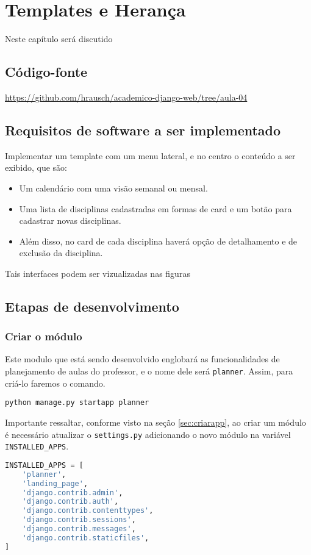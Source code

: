 \chapter{Templates e Heran\c{c}a}
Neste capítulo será discutido

\section{Código-fonte}
\href{https://github.com/hrausch/academico-django-web/tree/aula-04}{https://github.com/hrausch/academico-django-web/tree/aula-04}

\section{Requisitos de software a ser implementado}
Implementar um template com um menu lateral, e no centro o conteúdo a ser exibido, que são:
\begin{itemize}
    \item Um calendário com uma visão semanal ou mensal.
    \item Uma lista de disciplinas cadastradas em formas de card e um botão para cadastrar novas disciplinas.
    \item Além disso, no card de cada disciplina haverá opção de detalhamento e de exclusão da disciplina.
\end{itemize}
Tais interfaces podem ser vizualizadas nas figuras


\section{Etapas de desenvolvimento}

\subsection{Criar o módulo}
Este modulo que está sendo desenvolvido englobará as funcionalidades de planejamento de aulas do professor, e o nome dele será \texttt{planner}. Assim, para criá-lo faremos o comando.

\texttt{python manage.py startapp planner}

Importante ressaltar, conforme visto na seção \ref{sec:criarapp}, ao criar um módulo é necessário atualizar o \texttt{settings.py} adicionando o novo módulo na variável \texttt{INSTALLED\_APPS}. 
\begin{lstlisting}[language=Python]
    INSTALLED_APPS = [
    'planner',
    'landing_page',
    'django.contrib.admin',
    'django.contrib.auth',
    'django.contrib.contenttypes',
    'django.contrib.sessions',
    'django.contrib.messages',
    'django.contrib.staticfiles',
]

\end{lstlisting}

